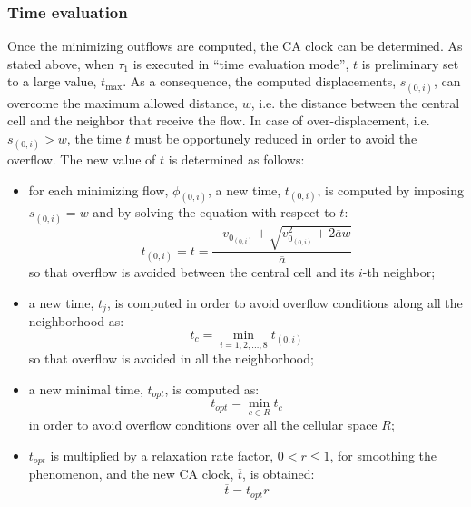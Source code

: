\subsubsection{Time evaluation}\label{sect:modeltimeEvaluation}
Once the minimizing outflows are computed, the CA clock can be determined. As stated above, when $\tau_1$ is executed in ``time evaluation mode'', $t$ is preliminary set to a large value, $t_{\max}$. As a consequence, the computed displacements, $s_{(0,i)}$, can overcome the maximum allowed distance, $w$, i.e. the distance between the central cell and the neighbor that receive the flow. In case of over-displacement, i.e. $s_{(0,i)} > w$, the time $t$ must be opportunely reduced in order to avoid the overflow. The new value of $t$ is determined as follows:


\begin{itemize}

\item for each minimizing flow, $\phi_{(0,i)}$, a new time, $t_{(0,i)}$, is computed by imposing $s_{(0,i)} = w$ and by solving the equation with respect to $t$:
$$
t_{(0,i)} = t = \frac{ - v_{0_{(0,i)}} + \sqrt{v_{0_{(0,i)}}^2 + 2 \overline{a} w} }{\overline{a}}
$$
so that overflow is avoided between the central cell and its $i$-th neighbor;


\item a new time, $t_j$, is computed in order to avoid overflow conditions along all the neighborhood as:
$$
t_c = \min_{i=1,2, \ldots ,8} t_{(0,i)}
$$
so that overflow is avoided in all the neighborhood;

\item a new minimal time, $t_{opt}$, is computed as:
$$
t_{opt} = \min_{c \in R} t_{c}
$$
in order to avoid overflow conditions over all the cellular space $R$;

\item $t_{opt}$ is multiplied by a relaxation rate factor, $0 < r \leq 1$, for smoothing the phenomenon, and the new CA clock, $\overline{t}$, is obtained:
$$
\overline{t} = t_{opt} r
$$
\end{itemize}

